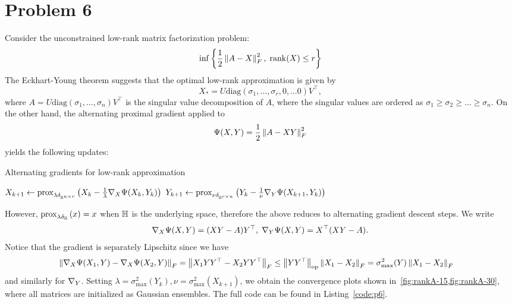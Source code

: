 \documentclass[10pt]{article}
\begin{document}
\section*{Problem 6}
Consider the unconstrained low-rank matrix factorization problem:
\[
    \inf\left\{ \frac{1}{2}\left \| A - X \right \|_F^2, \; \mathrm{rank}(X) \leq r \right\}
\]
The Eckhart-Young theorem suggests that the optimal low-rank approximation is
given by
\[
    X_* = U \mathrm{diag}(\sigma_1, \dots, \sigma_r, 0, \dots 0) V^\top,
\]
where $A = U \mathrm{diag}(\sigma_1, \dots, \sigma_n) V^\top$ is the singular
value
decomposition of $A$, where the singular values are ordered as $\sigma_1 \geq
\sigma_2 \geq \dots \geq \sigma_n$.
On the other hand, the alternating proximal gradient applied to
\[
    \Psi(X, Y) = \frac{1}{2} \left \| A - XY \right \|_F^2
\]
yields the following updates:
\begin{algorithm}
    \caption{Alternating gradients for low-rank approximation}
    \begin{algorithmic}
        \Repeat
            \State $X_{k+1} \gets \mathrm{prox}_{\lambda \delta_{\mathbb{R}^{n \times r}}}\left( 
                X_k - \frac{1}{\lambda} \nabla_X \Psi(X_k, Y_k) \right)$
            \State $Y_{k+1} \gets \mathrm{prox}_{\nu \delta_{\mathbb{R}^{r \times n}}}\left( 
                Y_k - \frac{1}{\nu} \nabla_Y \Psi(X_{k+1}, Y_k) \right)$
    \end{algorithmic}
\end{algorithm}
However, $\mathrm{prox}_{\lambda \delta_{\mathbb{H}}}\left( x \right) = x$ when $\mathbb{H}$ is the underlying
space, therefore the above reduces to alternating gradient descent steps.
We write
\[
    \nabla_X \Psi(X, Y) = (XY - A) Y^\top, \; \nabla_Y \Psi(X, Y) = X^\top (XY -
    A).
\]
Notice that the gradient is separately Lipschitz since we have
\begin{align*}
    \left \| \nabla_{X} \Psi(X_1, Y) - \nabla_X \Psi(X_2, Y) \right \|_F &=
        \left \| X_1 Y Y^\top - X_2 Y Y^\top \right \|_F \leq \left \|  YY^\top  \right \|_{\mathrm{op}}
        \left \| X_1 - X_2 \right \|_F = \sigma_{\max}^2(Y) \left \| X_1 - X_2 \right \|_F
\end{align*}
and similarly for $\nabla_Y$. Setting $\lambda = \sigma_{\max}^2(Y_k), \nu =
\sigma_{\max}^2(X_{k+1})$, we obtain the convergence plots shown
in~\cref{fig:rankA-15,fig:rankA-30}, where all matrices are initialized as
Gaussian ensembles. The full code can be found in Listing~\ref{code:p6}.
\end{document}
